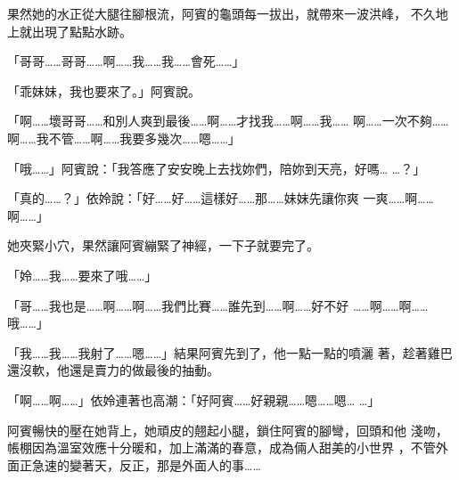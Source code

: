 果然她的水正從大腿往腳根流，阿賓的龜頭每一拔出，就帶來一波洪峰，
不久地上就出現了點點水跡。

「哥哥……哥哥……啊……我……我……會死……」

「乖妹妹，我也要來了。」阿賓說。

「啊……壞哥哥……和別人爽到最後……啊……才找我……啊……我……
啊……一次不夠……啊……我不管……啊……我要多幾次……嗯……」

「哦……」阿賓說：「我答應了安安晚上去找妳們，陪妳到天亮，好嗎…
…？」

「真的……？」依姈說：「好……好……這樣好……那……妹妹先讓你爽
一爽……啊……啊……」

她夾緊小穴，果然讓阿賓繃緊了神經，一下子就要完了。

「姈……我……要來了哦……」

「哥……我也是……啊……啊……我們比賽……誰先到……啊……好不好
……啊……啊……哦……」

「我……我……我射了……嗯……」結果阿賓先到了，他一點一點的噴灑
著，趁著雞巴還沒軟，他還是賣力的做最後的抽動。

「啊……啊……」依姈連著也高潮：「好阿賓……好親親……嗯……嗯…
…」

阿賓暢快的壓在她背上，她頑皮的翹起小腿，鎖住阿賓的腳彎，回頭和他
淺吻，帳棚因為溫室效應十分暖和，加上滿滿的春意，成為倆人甜美的小世界
，不管外面正急速的變著天，反正，那是外面人的事……










